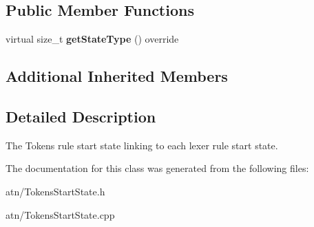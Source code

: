 \subsection*{Public Member Functions}
\begin{DoxyCompactItemize}
\item 
\mbox{\label{classantlr4_1_1atn_1_1TokensStartState_a4ab82b7dde53dc43ab634b3b0b769eb9}} 
virtual size\+\_\+t {\bfseries get\+State\+Type} () override
\end{DoxyCompactItemize}
\subsection*{Additional Inherited Members}


\subsection{Detailed Description}
The Tokens rule start state linking to each lexer rule start state. 

The documentation for this class was generated from the following files\+:\begin{DoxyCompactItemize}
\item 
atn/Tokens\+Start\+State.\+h\item 
atn/Tokens\+Start\+State.\+cpp\end{DoxyCompactItemize}
